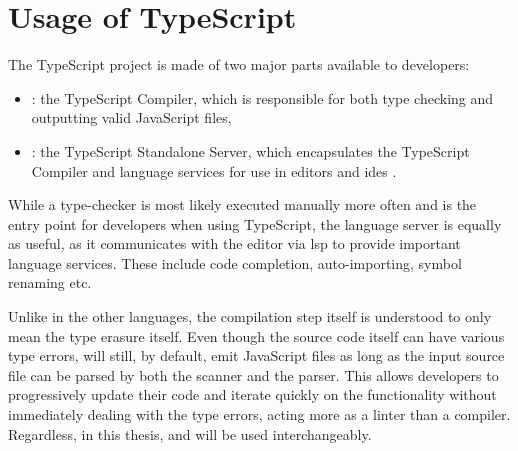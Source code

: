 \section{Usage of TypeScript}

The TypeScript project is made of two major parts available to developers:

\begin{itemize}
  \item {}: the TypeScript Compiler, which is responsible for both type checking and outputting valid JavaScript files,
  \item {}: the TypeScript Standalone Server, which encapsulates the TypeScript Compiler and language services for use in editors and \acrshort{ide}s \cite{StandaloneServerTsserver}.
\end{itemize}

While a type-checker is most likely executed manually more often and is the entry point for developers when using TypeScript, the language server is equally as useful, as it communicates with the editor via \acrfull{lsp} to provide important language services. These include code completion, auto-importing, symbol renaming etc.

Unlike in the other languages, the compilation step itself is understood to only mean the type erasure itself. Even though the source code itself can have various type errors,  will still, by default, emit JavaScript files as long as the input source file can be parsed by both the scanner and the parser. This allows developers to progressively update their code and iterate quickly on the functionality without immediately dealing with the type errors, acting more as a linter than a compiler. Regardless, in this thesis,  and  will be used interchangeably.
